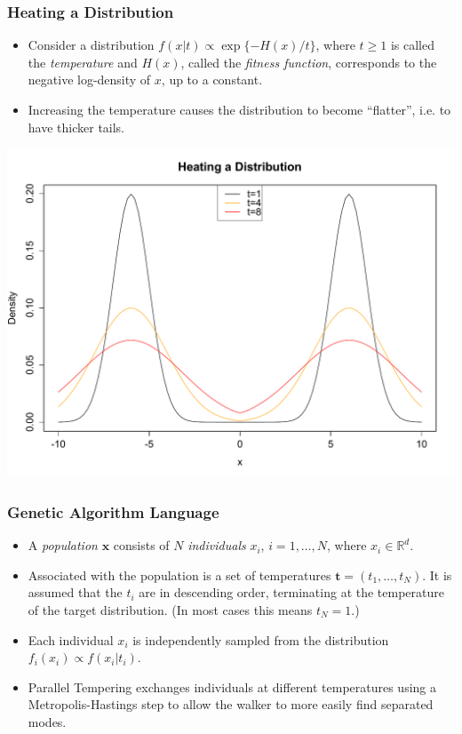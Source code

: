 \documentclass{beamer}\usepackage[]{graphicx}\usepackage[]{color}
\newcommand{\bt}{\mathbf t}
\begin{document}
\begin{frame}
  \frametitle{Heating a Distribution}
  \begin{itemize}
  \item Consider a distribution $f(x|t) \propto \exp\{
    -H(x)/t \}$, where $t\ge 1$ is called the \emph{temperature} and
    $H(x)$, called the \emph{fitness function}, corresponds to the
    negative log-density of $x$, up to a constant.
  \item Increasing the temperature causes the distribution to become
    ``flatter'', i.e. to have thicker tails.
  \end{itemize}
\end{frame}

\begin{frame}
  \begin{center}
  \includegraphics[scale=0.4]{figure/heat.pdf}    
  \end{center}
\end{frame}

\begin{frame}
  \frametitle{Genetic Algorithm Language}
  \begin{itemize}
  \item A \emph{population} $\mathbf{x}$ consists of $N$
    \emph{individuals} $x_i$, $i = 1, \ldots, N$, where $x_i \in
    \mathbb{R}^d$.
  \item Associated with the population is a set of temperatures $\bt
    = (t_1,\ldots,t_N)$. It is assumed that the $t_i$ are in
    descending order, terminating at the temperature of the target
    distribution. (In most cases this means $t_N =1$.)
  \item Each individual $x_i$ is independently sampled from the
    distribution $f_i(x_i) \propto f(x_i|t_i)$.
  \item Parallel Tempering exchanges individuals at different temperatures using a Metropolis-Hastings step to allow the walker to more easily find separated modes.
  \end{itemize}
\end{frame}
\end{document}
